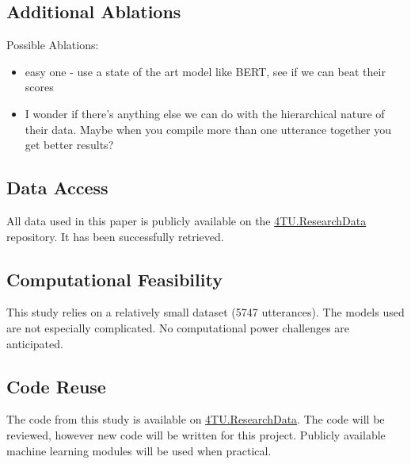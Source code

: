 \documentclass[11pt,a4paper]{article}
\begin{document}
\subsection{Additional Ablations}
Possible Ablations:
\begin{itemize}
  \item easy one - use a state of the art model like BERT, see if we can beat their scores 
  \item I wonder if there's anything else we can do with the hierarchical nature of their data. Maybe when you compile more than one utterance together you get better results?
\end{itemize}

\subsection{Data Access}
All data used in this paper is publicly available on the \href{https://data.4tu.nl/info/en/about-4turesearchdata/organisation}{4TU.ResearchData} repository. It has been successfully retrieved. 

\subsection{Computational Feasibility}
This study relies on a relatively small dataset (5747 utterances). The models used are not especially complicated. No computational power challenges are anticipated. 

\subsection{Code Reuse}
The code from this study is available on \href{https://data.4tu.nl/info/en/about-4turesearchdata/organisation}{4TU.ResearchData}. The code will be reviewed, however new code will be written for this project. Publicly available machine learning modules will be used when practical. 



\end{document}
